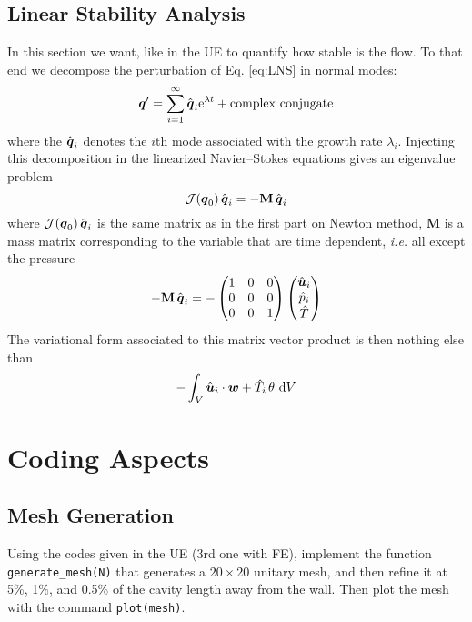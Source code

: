 \documentclass[12pt,a4paper]{scrartcl}
\renewcommand{\vec}[1]{{\mbox{\boldmath $ #1 $}}}
\newcommand{\dd}{\textrm{d}}
\begin{document}
\subsection{Linear Stability Analysis}
In this section we want, like in the UE to quantify how stable is the flow. To that end we decompose the perturbation of Eq. \ref{eq:LNS} in normal modes:
\begin{equation}
\vec q' = \sum\limits_{i=1}^\infty \hat{\vec q}_i \mathrm{e}^{\lambda t} + \mathrm{complex}\ \mathrm{conjugate}
\end{equation}
where the $\hat{\vec q}_i$ denotes the $i$th mode associated with the growth rate $\lambda_i$. Injecting this decomposition in the linearized Navier--Stokes equations gives an eigenvalue problem
\begin{equation}
\mathcal J(\vec q_0)\, \hat{\vec q}_i = - \mathbf M\, \hat{\vec q}_i
\end{equation}
where $\mathcal J(\vec q_0) \, \hat{\vec q}_i$ is the same matrix as in the first part on Newton method,
$\mathbf M$ is a mass matrix corresponding to the variable that are time dependent, \textit{i.e.} all except the pressure
\begin{equation}
-\mathbf{M}\,\hat{\vec q}_i = -\begin{pmatrix}
1 & 0 & 0 \\
0 & 0 & 0 \\
0 & 0 & 1 
\end{pmatrix}
\begin{pmatrix}
\hat{\vec u}_i \\
\hat{p}_i\\
\hat{T}
\end{pmatrix}
\end{equation}
The variational form associated to this matrix vector product is then nothing else than
\begin{equation}
-\int_V \hat{\vec u}_i \cdot \vec w + \hat{T}_i\,\theta  \  \dd V
\end{equation}

\section{Coding Aspects}
\subsection{Mesh Generation}
Using the codes given in the UE (3rd one with FE), implement the function \texttt{generate\_mesh(N)} that generates a $20 \times 20$ unitary mesh, and then refine it at  5\%, 1\%, and 0.5\% of the cavity length away from the wall. Then plot the mesh with the command \texttt{plot(mesh)}.
\end{document}
